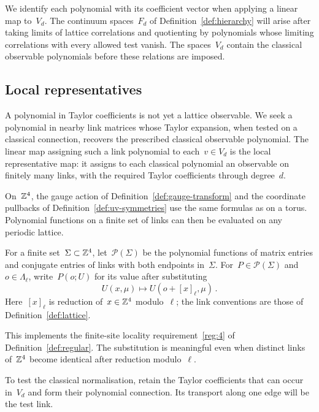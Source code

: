 We identify each polynomial with its coefficient vector when applying a linear map to~$V_d$.
The continuum spaces~$F_d$ of Definition~\ref{def:hierarchy} will arise after taking limits of lattice correlations and quotienting by polynomials whose limiting correlations with every allowed test vanish.
The spaces~$V_d$ contain the classical observable polynomials before these relations are imposed.

\subsection{Local representatives}\label{subsec:uv-local}

A polynomial in Taylor coefficients is not yet a lattice observable.
We seek a polynomial in nearby link matrices whose Taylor expansion, when tested on a classical connection, recovers the prescribed classical observable polynomial.
The linear map assigning such a link polynomial to each~$v\in V_d$ is the local representative map: it assigns to each classical polynomial an observable on finitely many links, with the required Taylor coefficients through degree~$d$.

On~$\mathbb Z^4$, the gauge action of Definition~\ref{def:gauge-transform} and the coordinate pullbacks of Definition~\ref{def:uv-symmetries} use the same formulas as on a torus.
Polynomial functions on a finite set of links can then be evaluated on any periodic lattice.

\begin{definition}\label{def:uv-polynomials}
For a finite set~$\Sigma\subset\mathbb Z^4$, let~$\mathcal P(\Sigma)$ be the polynomial functions of matrix entries and conjugate entries of links with both endpoints in~$\Sigma$.
For~$P\in\mathcal P(\Sigma)$ and~$o\in\Lambda_\ell$, write~$P(o;U)$ for its value after substituting
\begin{equation}\label{eq:uv-placement}
 U(x,\mu)\longmapsto U(o+[x]_\ell,\mu)\,.
\end{equation}
Here~$[x]_\ell$ is reduction of~$x\in\mathbb Z^4$ modulo~$\ell$; the link conventions are those of Definition~\ref{def:lattice}.
\end{definition}

This implements the finite-site locality requirement~\ref{reg:4} of Definition~\ref{def:regular}.
The substitution is meaningful even when distinct links of~$\mathbb Z^4$ become identical after reduction modulo~$\ell$.

To test the classical normalisation, retain the Taylor coefficients that can occur in~$V_d$ and form their polynomial connection.
Its transport along one edge will be the test link.

